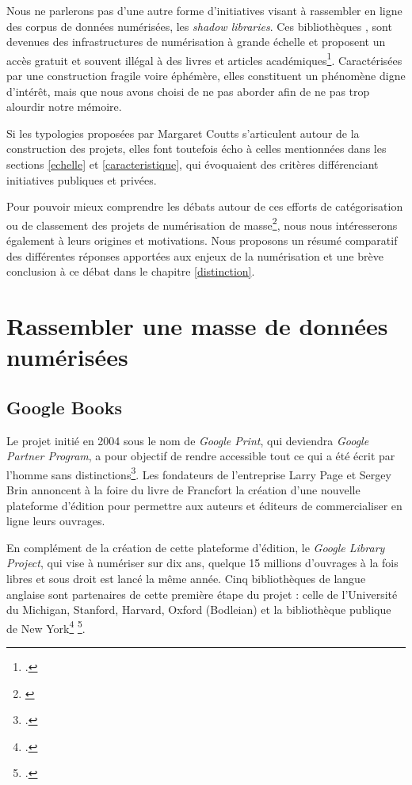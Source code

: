 Nous ne parlerons pas d'une autre forme d'initiatives visant à rassembler en ligne des corpus de données numérisées, les \textit{shadow libraries}. Ces bibliothèques , sont devenues des infrastructures de numérisation à grande échelle et proposent un accès gratuit et souvent illégal à des livres et articles académiques\footcite{thylstrup_politics_2018}. Caractérisées par une construction fragile voire éphémère, elles constituent un phénomène digne d'intérêt, mais que nous avons choisi de ne pas aborder afin de ne pas trop alourdir notre mémoire.

Si les typologies proposées par Margaret Coutts s'articulent autour de la construction des projets, elles font toutefois écho à celles mentionnées dans les sections \ref{echelle} et \ref{caracteristique}, qui évoquaient des critères différenciant initiatives publiques et privées. 

Pour pouvoir mieux comprendre les débats autour de ces efforts de catégorisation ou de classement des projets de numérisation de masse\footnote{\cite[p.245]{jones_public_2017}}, nous nous intéresserons également à leurs origines et motivations. Nous proposons un résumé comparatif des différentes réponses apportées aux enjeux de la numérisation et une brève conclusion à ce débat dans le chapitre \ref{distinction}.

\section{Rassembler une masse de données numérisées}
\subsection{Google Books}
Le projet initié en 2004 sous le nom de \textit{Google Print}, qui deviendra \textit{Google Partner Program}, a pour objectif de rendre accessible tout ce qui a été écrit par l'homme sans distinctions\footcite{thelle_persuasive_2011}. Les fondateurs de l'entreprise Larry Page et Sergey Brin annoncent à la foire du livre de Francfort la création d'une nouvelle plateforme d'édition pour permettre aux auteurs et éditeurs de commercialiser en ligne leurs ouvrages.

En complément de la création de cette plateforme d'édition, le \textit{Google Library Project}, qui vise à numériser sur dix ans, quelque 15 millions d'ouvrages à la fois libres et sous droit est lancé la même année. Cinq bibliothèques de langue anglaise sont partenaires de cette première étape du projet : celle de l'Université du Michigan, Stanford, Harvard, Oxford (Bodleian) et la bibliothèque publique de New York\footcite{thylstrup_politics_2018} \footcite{weiss_assessing_2013}. 

